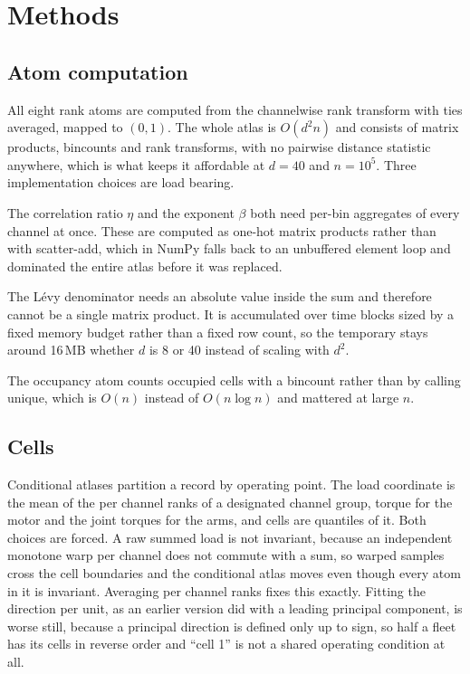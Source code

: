 \documentclass[11pt]{article}
\begin{document}
\section{Methods}

\subsection{Atom computation}

All eight rank atoms are computed from the channelwise rank transform with ties
averaged, mapped to $(0,1)$. The whole atlas is $O(d^2 n)$ and consists of
matrix products, bincounts and rank transforms, with no pairwise distance
statistic anywhere, which is what keeps it affordable at $d=40$ and
$n=10^5$. Three implementation choices are load bearing.

The correlation ratio $\eta$ and the exponent $\beta$ both need per-bin
aggregates of every channel at once. These are computed as one-hot matrix
products rather than with scatter-add, which in NumPy falls back to an
unbuffered element loop and dominated the entire atlas before it was replaced.

The L\'evy denominator needs an absolute value inside the sum and therefore
cannot be a single matrix product. It is accumulated over time blocks sized by
a fixed memory budget rather than a fixed row count, so the temporary stays
around 16\,MB whether $d$ is 8 or 40 instead of scaling with $d^2$.

The occupancy atom counts occupied cells with a bincount rather than by calling
unique, which is $O(n)$ instead of $O(n\log n)$ and mattered at large $n$.

\subsection{Cells}

Conditional atlases partition a record by operating point. The load coordinate
is the mean of the per channel ranks of a designated channel group, torque for
the motor and the joint torques for the arms, and cells are quantiles of it.
Both choices are forced. A raw summed load is not invariant, because an
independent monotone warp per channel does not commute with a sum, so warped
samples cross the cell boundaries and the conditional atlas moves even though
every atom in it is invariant. Averaging per channel ranks fixes this exactly.
Fitting the direction per unit, as an earlier version did with a leading
principal component, is worse still, because a principal direction is defined
only up to sign, so half a fleet has its cells in reverse order and ``cell 1''
is not a shared operating condition at all.
\end{document}
